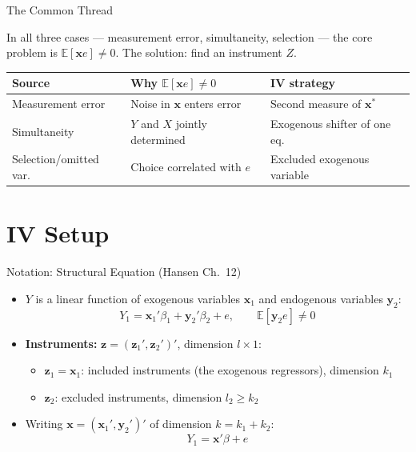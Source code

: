 \documentclass[aspectratio=169, handout]{beamer}
\numberwithin{equation}{section}
\begin{document}
\begin{frame}{The Common Thread}
\begin{tcolorbox}[colback=blue!5, colframe=blue!50]
In all three cases --- measurement error, simultaneity, selection --- the core problem is $\mathbb{E}[\bm{x}e]\neq 0$.  The solution: find an instrument $Z$.
\end{tcolorbox}
\vspace{0.3cm}
\begin{center}
\begin{tabular}{lll}
\toprule
\textbf{Source} & \textbf{Why $\mathbb{E}[\bm{x}e]\neq 0$} & \textbf{IV strategy}\\
\midrule
Measurement error & Noise in $\bm{x}$ enters error & Second measure of $\bm{x}^*$\\
Simultaneity & $Y$ and $X$ jointly determined & Exogenous shifter of one eq.\\
Selection/omitted var. & Choice correlated with $e$ & Excluded exogenous variable\\
\bottomrule
\end{tabular}
\end{center}
\end{frame}


\section{IV Setup}

\begin{frame}{Notation: Structural Equation (Hansen Ch.\ 12)}
\begin{itemize}
\item $Y$ is a linear function of exogenous variables $\bm{x}_1$ and endogenous variables $\bm{y}_2$:
$$Y_1=\bm{x}_1'\beta_1+\bm{y}_2'\beta_2+e, \qquad \mathbb{E}[\bm{y}_2 e]\neq 0$$
\item \textbf{Instruments:} $\bm{z}=(\bm{z}_1', \bm{z}_2')'$, dimension $l\times 1$:
\begin{itemize}
\item $\bm{z}_1 = \bm{x}_1$: included instruments (the exogenous regressors), dimension $k_1$
\item $\bm{z}_2$: excluded instruments, dimension $l_2 \geq k_2$
\end{itemize}
\item Writing $\bm{x}=(\bm{x}_1', \bm{y}_2')'$ of dimension $k=k_1+k_2$:
$$Y_1 = \bm{x}'\beta + e$$
\end{itemize}
\end{frame}
\end{document}

